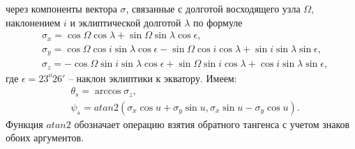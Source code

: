 через компоненты вектора $\sigma$, связанные с долготой восходящего узла $\Omega$,
наклонением $i$ и эклиптической долготой $\lambda$ по формуле
\begin{equation}
\begin{aligned}
    & \sigma_x =  \cos\Omega\cos\lambda + \sin\Omega\sin\lambda\cos\epsilon, \\
    & \sigma_y =  \cos\Omega\cos i\sin\lambda\cos\epsilon - \sin\Omega\cos i\cos\lambda + \sin i\sin\lambda\sin\epsilon, \\
    & \sigma_z = -\cos\Omega\sin i\sin\lambda\cos\epsilon + \sin\Omega\sin i\cos\lambda + \cos i\sin\lambda\sin\epsilon,
\end{aligned}
\end{equation}
где $\epsilon = 23^o26'$ -- наклон эклиптики к экватору. Имеем:
\begin{equation}
  \begin{aligned}
    & \theta_s = \arccos\sigma_z, \\
    & \psi_s = atan2(\sigma_x\cos u + \sigma_y\sin u, \sigma_x\sin u - \sigma_y\cos u).
  \end{aligned}
\end{equation}
Функция $atan2$ обозначает операцию взятия обратного тангенса с учетом знаков
обоих аргументов.
